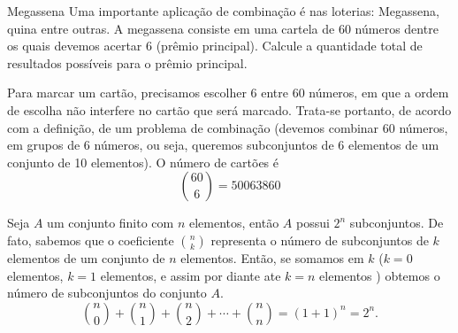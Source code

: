 \begin{frame}
\begin{exem}{Megassena}
Uma importante aplicação de combinação  é nas loterias:
Megassena, quina entre outras. A megassena consiste em uma cartela de 60
números dentre os quais devemos acertar 6 (prêmio principal). Calcule a
quantidade total de resultados possíveis para o prêmio principal.

Para marcar um cartão, precisamos escolher 6 entre 60 números, em que a
ordem de escolha não interfere no cartão que será marcado. Trata-se portanto, de
acordo com a definição, de um problema de combinação (devemos
combinar 60 números, em grupos de 6 números, ou seja, queremos subconjuntos
de 6 elementos de um conjunto de 10 elementos). O número de cartões é 
$$\displaystyle
{60 \choose 6} = 50063860
$$
 
\end{exem}

\begin{exem}
Seja $A$ um conjunto finito com $n$ elementos, então $A$ possui $2^n$ subconjuntos. De fato, sabemos que o coeficiente  
$\displaystyle{{n \choose k}}$ representa o número de subconjuntos de $k$ elementos de um conjunto de $n$ elementos. 
Então, se somamos em $k$ ($k=0$ elementos, $k=1$ elementos, e assim por diante ate $k=n$ elementos ) obtemos o número de subconjuntos do conjunto $A$. 
$$
{n \choose 0} + {n \choose 1} + {n \choose 2} + \cdots + {n \choose n} = (1+1)^n = 2^n.
$$
\end{exem}
 
\end{frame}


